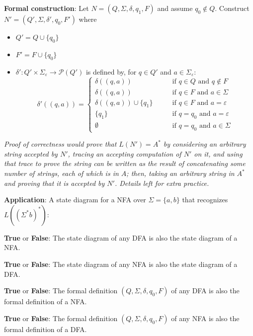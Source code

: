 \documentclass[12pt, oneside]{article}
\begin{document}
{\bf Formal construction}: Let 
$N = (Q, \Sigma, \delta, q_1, F)$ and assume $q_0 \notin Q$.
Construct $N' = (Q', \Sigma, \delta', q_0, F')$ where
\begin{itemize}
    \item $Q' = Q \cup \{q_0\}$
    \item $F' = F \cup \{q_0\}$
    \item $\delta': Q' \times \Sigma_\varepsilon \to \mathcal{P}(Q')$ is defined by, for $q \in Q'$ and $a \in \Sigma_{\varepsilon}$:
        \[
            \delta'((q,a))=\begin{cases}  
                \delta ((q,a)) &\qquad\text{if } q\in Q \textrm{ and } q \notin F\\ 
                \delta ((q,a)) &\qquad\text{if } q\in F \textrm{ and } a \in \Sigma\\ 
                \delta ((q,a)) \cup \{q_1\} &\qquad\text{if } q\in F \textrm{ and } a = \varepsilon\\ 
                \{q_1\} &\qquad\text{if } q = q_0 \textrm{ and } a = \varepsilon \\
                \emptyset &\qquad\text{if } q = q_0 \textrm { and } a \in \Sigma
            \end{cases}
        \]
\end{itemize}


{\it Proof of correctness would prove that $L(N') = A^*$ by considering
an arbitrary string accepted by $N'$, tracing an accepting computation of $N'$ on it, and using 
that trace to prove the string can be written as the result of concatenating some number of strings, 
each of which is in $A$; then, taking an arbitrary 
string in $A^*$ and proving that it is accepted by $N'$. Details left for extra practice.}


{\bf Application}: A state diagram for a NFA over $\Sigma = \{a,b\}$ 
that recognizes $L (( \Sigma^* b)^* )$:

\vspace{200pt}




{\bf True} or {\bf False}: The state diagram of any DFA is also the state diagram of a NFA.

{\bf True} or {\bf False}: The state diagram of any NFA is also the state diagram of a DFA.

{\bf True} or {\bf False}: The formal definition $(Q, \Sigma, \delta, q_0, F)$ of any DFA is also the formal definition of a NFA.

{\bf True} or {\bf False}: The formal definition $(Q, \Sigma, \delta, q_0, F)$  of any NFA is also the formal definition of a DFA.
\end{document}
